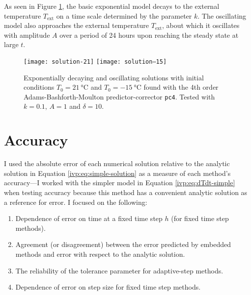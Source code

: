 \documentclass[11pt, a4paper]{article}
\begin{document}
As seen in Figure \ref{ivp:fig:solution}, the basic exponential model decays to the external temperature $ T_{\text{ext}} $ on a time scale determined by the parameter $ k $. The oscillating model also approaches the external temperature $ T_{\text{ext}} $, about which it oscillates with amplitude $ A $ over a period of 24 hours upon reaching the steady state at large $ t $. 

\begin{figure}[htb!]
\centering

{\texttt{[image: solution-21]}}
\vfill \vspace{2mm}
{\texttt{[image: solution--15]}} \vfil

\caption{Exponentially decaying and oscillating solutions with initial conditions $ T_{0} = \SI{21}{\degreeCelsius} $ and $ T_{0} = \SI{-15}{\degreeCelsius} $ found with the 4th order Adams-Bashforth-Moulton predictor-corrector \texttt{pc4}. Tested with $ k = 0.1 $, $ A = 1 $ and $ \delta = 10 $.} 

\label{ivp:fig:solution}

\end{figure} 

\section{Accuracy}
I used the absolute error of each numerical solution relative to the analytic solution in Equation \ref{ivp:eq:simple-solution} as a measure of each method's accuracy---I worked with the simpler model in Equation \ref{ivp:eq:dTdt-simple} when testing accuracy because this method has a convenient analytic solution as a reference for error. I focused on the following:
\begin{enumerate}

	\item Dependence of error on time at a fixed time step $ h $ (for fixed time step methods).
	
	\item Agreement (or disagreement) between the error predicted by embedded methods and error with respect to the analytic solution.
	
	\item The reliability of the tolerance parameter for adaptive-step methods.
	
	\item Dependence of error on step size for fixed time step methods.
\end{enumerate}
\end{document}
